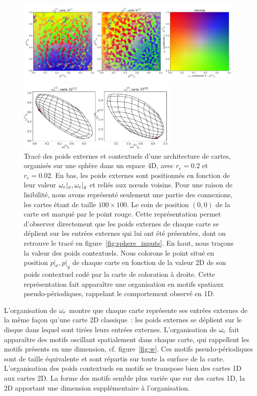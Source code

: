 \documentclass[../main]{subfiles}
\begin{document}
\begin{figure}[h!]
	\begin{minipage}{\textwidth}
	\includegraphics[width=\textwidth]{wc_rc002_afterbug_nopoints.pdf}
	\end{minipage}
	\begin{minipage}{\textwidth}
		\includegraphics[width=0.7\textwidth]{we_rc002_afterbug_step10.pdf}
		\caption{Tracé des poids externes et contextuels d'une architecture de cartes, organisés sur une sphère dans un espace 4D, avec $r_e =0.2$ et $r_c = 0.02$.
		En bas, les poids externes sont positionnés en fonction de leur valeur $\omega_e|_x, \omega_e|_y$ et reliés aux n\oe{}uds voisins. Pour une raison de lisibilité, nous avons représenté seulement une partie des connexions, les cartes étant de taille $100 \times 100$. Le coin de position $(0,0)$ de la carte est marqué par le point rouge. Cette représentation permet d'observer directement que les poids externes de chaque carte se déplient sur les entrées externes qui lui ont été présentées, dont on retrouve le tracé en figure~\ref{fig:sphere_inputs}.
		En haut, nous traçons la valeur des poids contextuels. Nous colorons le point situé en position $p|_x, p|_y$ de chaque carte en fonction de la valeur 2D de son poids contextuel codé par la carte de coloration à droite. Cette représentation fait apparaître une organisation en motifs spatiaux pseudo-périodiques, rappelant le comportement observé en 1D.
		\label{fig:2som_s_002_wc}}
		\end{minipage}
\end{figure}


L'organisation de $\omega_e$ montre que chaque carte représente ses entrées externes de la même façon qu'une carte 2D classique~: les poids externes se déplient sur le disque dans lequel sont tirées leurs entrées externes. 
L'organisation de $\omega_c$ fait apparaître des motifs oscillant spatialement dans chaque carte, qui rappellent les motifs présents en une dimension, cf. figure~\ref{fig:w}.
Ces motifs pseudo-périodiques sont de taille équivalente et sont répartis sur toute la surface de la carte. 
L'organisation des poids contextuels en motifs se transpose bien des cartes 1D aux cartes 2D. La forme des motifs semble plus variée que sur des cartes 1D, la 2D apportant une dimension supplémentaire à l'organisation.
\end{document}
